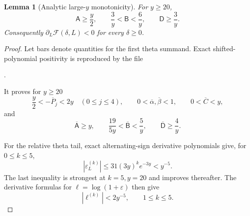 \documentclass{amsart}
\numberwithin{equation}{section}
\newtheorem{lemma}[theorem]{Lemma}
\theoremstyle{definition}
\theoremstyle{remark}
\newcommand{\Fcal}{\mathcal F}
\begin{document}
\begin{lemma}[Analytic large-$y$ monotonicity]\label{lem:largepost}
For $y\ge20$,
\begin{equation}\label{eq:ABDcoarse}
 \mathsf A\ge\frac y2,\qquad
 \frac3y<\mathsf B<\frac6y,
 \qquad
 \mathsf D\ge\frac3y.
\end{equation}
Consequently $\partial_L\Fcal(\delta,L)<0$ for every $\delta\ge0$.
\end{lemma}
\begin{proof}
Let bars denote quantities for the first theta summand.  Exact shifted-polynomial positivity is reproduced by the file\par\smallskip\noindent{}.\par\smallskip\noindent It proves for $y\ge20$
\begin{equation}\label{eq:firstasymp}
 \frac y2<-\overline P_j<2y\quad(0\le j\le4),
 \qquad0<\overline\alpha,\overline\beta<1,
 \qquad0<\overline C<y,
\end{equation}
and
\begin{equation}\label{eq:ABDfirst}
 \overline{\mathsf A}\ge y,
 \qquad \frac{19}{5y}<\overline{\mathsf B}<\frac5y,
 \qquad \overline{\mathsf D}\ge\frac4y.
\end{equation}

For the relative theta tail, exact alternating-sign derivative polynomials give, for $0\le k\le5$,
\begin{equation}\label{eq:epstaily20}
 |\varepsilon^{(k)}_L|
 \le31(3y)^k e^{-3y}<y^{-5}.
\end{equation}
The last inequality is strongest at $k=5,y=20$ and improves thereafter.  The derivative formulas for $\ell=\log(1+\varepsilon)$ then give
\begin{equation}\label{eq:elltaily20}
 |\ell^{(k)}|<2y^{-5},\qquad1\le k\le5.
\end{equation}


\end{proof}
\end{document}
